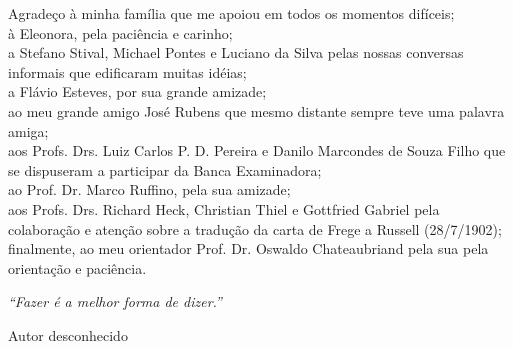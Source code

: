 \documentclass[diss]{UFRuralRJ}
\begin{document}
\noindent Agradeço à minha família que me apoiou em todos os momentos difíceis;\\ 
à Eleonora, pela paciência e carinho; \\
a Stefano Stival, Michael Pontes e Luciano da Silva pelas nossas conversas informais que edificaram muitas idéias; \\
a Flávio Esteves, por sua grande amizade; \\
ao meu grande amigo José Rubens que mesmo distante sempre teve uma palavra amiga; \\
aos Profs. Drs. Luiz Carlos P. D. Pereira e Danilo Marcondes de Souza Filho que se dispuseram a participar da Banca Examinadora; \\
ao Prof. Dr. Marco Ruffino, pela sua amizade; \\
aos Profs. Drs. Richard Heck, Christian Thiel e Gottfried Gabriel pela colaboração e atenção sobre a tradução da carta de Frege a Russell (28/7/1902); \\
finalmente, ao meu orientador Prof. Dr. Oswaldo Chateaubriand pela sua pela orientação e paciência.




\clearpage\mbox{}\vfill\hspace{80mm}\begin{minipage}{76mm}\begin{flushright}{\em
``Fazer é a melhor forma de dizer.''
\par
Autor desconhecido
}\end{flushright}\end{minipage}


\begin{abstract}
A dissertação apresenta e discute as idéias desenvolvidas por Crispin Wright no livro \textit{Frege’s Conception of Numbers as Objects} (1983), em particular, a tese segundo a qual a aritmética é analítica. Wright deposita toda sua força argumentativa (em relação à analiticidade da aritmética) na derivação dos axiomas da aritmética de segunda ordem de Dedekind-Peano a partir do Princípio de Hume. Assim, é nosso principal objetivo apresentar e discutir em que medida o Princípio de Hume é capaz de fornecer, segundo Wright, um relato da analiticidade da aritmética, assim como, as objeções a esse relato.
\end{abstract}
\end{document}
